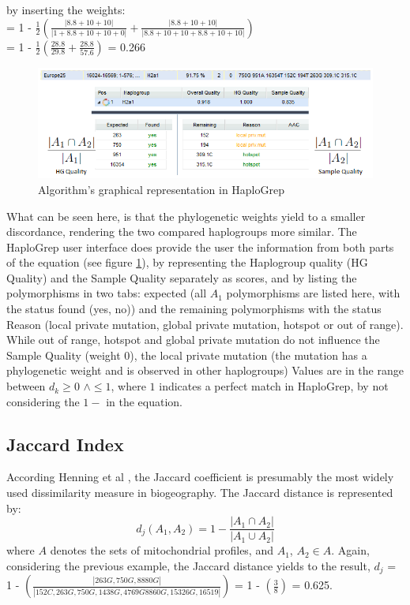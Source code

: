 by inserting the weights:
\\= 1 - $\frac{1}{2} \left(  \frac{\left| 8.8 + 10 +10 \right|}{\left| 1 + 8.8 + 10 +10 +0 \right|} +\frac{\left| 8.8 + 10 + 10 \right|}{\left| 8.8 + 10 + 10 + 8.8+ 10 +10 \right|} \right)$ 
\\= 1 - $\frac{1}{2} \left(  \frac{28.8}{29.8} +\frac{28.8}{57.6} \right)$ = 0.266\\
\begin{figure}[!ht]
    \centering
    \includegraphics[width=1\textwidth]{images/HG-sample-qual.png}
    \caption[Algorithm's graphical representation in HaploGrep]{ Algorithm's graphical representation in HaploGrep} 
    \label{hg:kulczy}
\end{figure}

What can be seen here, is that the phylogenetic weights yield to a smaller discordance, rendering the two compared haplogroups more similar. The HaploGrep user interface does provide the user the information from both parts of the equation (see figure \ref{hg:kulczy}), by representing the Haplogroup quality (HG Quality) and the Sample Quality separately as scores, and by listing the polymorphisms in two tabs: expected (all $A_1$ polymorphisms are listed here, with the status found (yes, no)) and the remaining polymorphisms with the status Reason (local private mutation, global private mutation, hotspot or out of range). While out of range, hotspot and global private mutation do not influence the Sample Quality (weight 0), the local private mutation (the mutation has a phylogenetic weight and is observed in other haplogroups)  
Values are in the range between $d_k \geq 0 $ $ \wedge \leq 1$, where $1$ indicates a perfect match in HaploGrep, by not considering the $1-$ in the equation. 

\subsection{Jaccard Index}
According Henning et al \cite{Hennig2006}, the Jaccard coefficient \cite{Jaccard1901} is presumably the most widely used dissimilarity measure in biogeography. The Jaccard distance is represented by:
\begin{equation}
d_j (A_1, A_2) = 1 -  \frac{\left|A_1  \cap A_2\right| }{\left|A_1 \cup A_2\right|} 
\end{equation}
where $A$ denotes the sets of mitochondrial profiles, and $A_1$, $A_2 \in A$. Again, considering the previous example, the Jaccard distance yields to the result, $d_j$ =
1 - $\left(  \frac{\left| 263G, 750G, 8880G \right|}{\left| 152C, 263G, 750G, 1438G, 4769G 8860G,15326G, 16519 \right|}  \right)$  = 
1 -  $\left(  \frac{3}{8} \right)$ = 0.625. 

